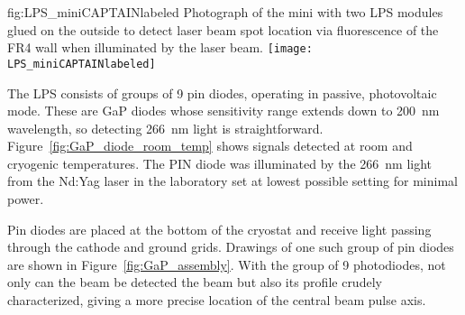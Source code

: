 \begin{dunefigure}{fig:LPS_miniCAPTAINlabeled}
{Photograph of the mini  with two LPS modules glued on the outside to detect laser beam spot location via fluorescence of the  FR4 wall when illuminated by the laser beam.}
\texttt{[image: LPS\_miniCAPTAINlabeled]} 
\end{dunefigure}

The LPS consists of groups of \num{9} pin diodes, operating in passive, photovoltaic mode. These are GaP diodes whose sensitivity range extends down to  \SI{200}{\nano\m} wavelength, so detecting \SI{266}{\nano\m} light is straightforward. Figure~\ref{fig:GaP_diode_room_temp} shows signals detected at room and cryogenic temperatures. The PIN diode was illuminated by the \SI{266}{\nano\m} light from the Nd:Yag
laser in the laboratory 
set at lowest possible setting for minimal power. 

Pin diodes are placed at the bottom of the cryostat and receive light passing through the cathode and ground grids.
Drawings of one such group of pin diodes are shown in Figure~\ref{fig:GaP_assembly}. With the group of \num{9} photodiodes, not only can the beam be detected the beam but also its profile crudely characterized, giving a more precise location of the central beam pulse axis.




